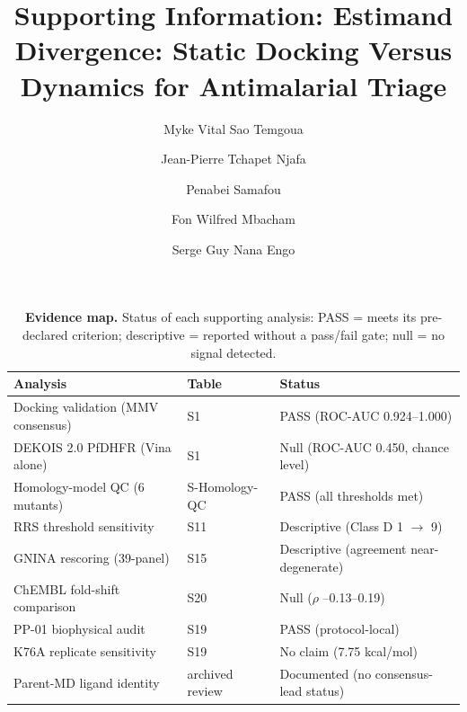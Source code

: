 \documentclass[11pt,a4paper]{article}
\title{Supporting Information: Estimand Divergence: Static Docking Versus Dynamics for Antimalarial Triage}
\author{Myke Vital Sao Temgoua \and Jean-Pierre Tchapet Njafa \and Penabei Samafou \and Fon Wilfred Mbacham \and Serge Guy Nana Engo}
\date{}
\begin{document}
\maketitle


\begin{table}[htbp]
\centering
\caption{\textbf{Evidence map.} Status of each supporting analysis: PASS = meets its pre-declared criterion; descriptive = reported without a pass/fail gate; null = no signal detected.}
\label{tab:s0_evidence_map}
\small
\begin{tabular}{@{}l l l@{}}
\toprule
Analysis & Table & Status \\
\midrule
Docking validation (MMV consensus) & S1 & PASS (ROC-AUC 0.924--1.000) \\
DEKOIS 2.0 PfDHFR (Vina alone) & S1 & Null (ROC-AUC 0.450, chance level) \\
Homology-model QC (6 mutants) & S-Homology-QC & PASS (all thresholds met) \\
RRS threshold sensitivity & S11 & Descriptive (Class D 1 $\to$ 9) \\
GNINA rescoring (39-panel) & S15 & Descriptive (agreement near-degenerate) \\
ChEMBL fold-shift comparison & S20 & Null ($\rho$ --0.13--0.19) \\
PP-01 biophysical audit & S19 & PASS (protocol-local) \\
K76A replicate sensitivity & S19 & No claim (7.75 kcal/mol) \\
Parent-MD ligand identity & archived review & Documented (no consensus-lead status) \\
\bottomrule
\end{tabular}
\end{table}





\end{document}
